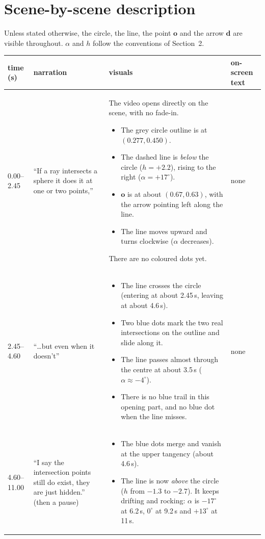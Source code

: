 \documentclass[10pt,a4paper]{article}
\newcommand{\vo}{\mathbf{o}}\newcommand{\vd}{\mathbf{d}}\newcommand{\vp}{\mathbf{p}}
\begin{document}
\section{Scene-by-scene description}
Unless stated otherwise, the circle, the line, the point $\vo$ and the arrow $\vd$ are visible throughout. $\alpha$ and $h$ follow the conventions of Section~2.

\begin{longtable}{@{}p{14mm}p{38mm}p{80mm}p{28mm}@{}}
\toprule
time (s) & narration & visuals & on-screen text\\\midrule\endhead
0.00--2.45 & ``If a ray intersects a sphere it does it at one or two points,'' &
The video opens directly on the scene, with no fade-in.
\begin{itemize}
\item The grey circle outline is at $(0.277,0.450)$.
\item The dashed line is \emph{below} the circle ($h=+2.2$), rising to the right ($\alpha=+17^\circ$).
\item $\vo$ is at about $(0.67,0.63)$, with the arrow pointing left along the line.
\item The line moves upward and turns clockwise ($\alpha$ decreases).
\end{itemize}
There are no coloured dots yet. & none\\
2.45--4.60 & ``\dots but even when it doesn't'' &
\begin{itemize}
\item The line crosses the circle (entering at about 2.45\,s, leaving at about 4.6\,s).
\item Two blue dots mark the two real intersections on the outline and slide along it.
\item The line passes almost through the centre at about 3.5\,s ($\alpha\approx-4^\circ$).
\item There is no blue trail in this opening part, and no blue dot when the line misses.
\end{itemize} & none\\
4.60--11.00 & ``I say the intersection points still do exist, they are just hidden.'' (then a pause) &
\begin{itemize}
\item The blue dots merge and vanish at the upper tangency (about 4.6\,s).
\item The line is now \emph{above} the circle ($h$ from $-1.3$ to $-2.7$). It keeps drifting and rocking: $\alpha$ is $-17^\circ$ at 6.2\,s, $0^\circ$ at 9.2\,s and $+13^\circ$ at 11\,s.

\end{itemize}
\end{longtable}
\end{document}
